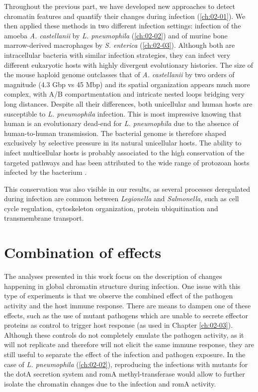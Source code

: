 Throughout the previous part, we have developed new approaches to detect chromatin features and quantify their changes during infection (\autoref{ch:02-01}). We then applied these methods in two different infection settings: infection of the amoeba \textit{A. castellanii} by \textit{L. pneumophila} (\autoref{ch:02-02}) and of murine bone marrow-derived macrophages by \textit{S. enterica} (\autoref{ch:02-03}). Although both are intracellular bacteria with similar infection strategies, they can infect very different eukaryotic hosts with highly divergent evolutionary histories. The size of the mouse haploid genome outclasses that of \textit{A. castellanii} by two orders of magnitude (4.3 Gbp vs 45 Mbp) and its spatial organization appears much more complex, with A/B compartmentation and intricate nested loops bridging very long distances. Despite all their differences, both unicellular and human hosts are susceptible to \textit{L. pneumophila} infection. This is most impressive knowing that human is an evolutionary dead-end for \textit{L. pneumophila} due to the absence of human-to-human transmission. The bacterial genome is therefore shaped exclusively by selective pressure in its natural unicellular hosts. The ability to infect multicellular hosts is probably associated to the high conservation of the targeted pathways and has been attributed to the wide range of protozoan hosts infected by the bacterium \cite{molofskyDifferentiateThriveLessons2004}.

This conservation was also visible in our results, as several processes deregulated during infection are common between \textit{Legionella} and \textit{Salmonella}, such as cell cycle regulation, cytoskeleton organization, protein ubiquitination and transmembrane transport.


\section{Combination of effects}

The analyses presented in this work focus on the description of changes happening in global chromatin structure during infection. One issue with this type of experiments is that we observe the combined effect of the pathogen activity and the host immune response. There are means to dampen one of these effects, such as the use of mutant pathogens which are unable to secrete effector proteins as control to trigger host response (as used in Chapter \autoref{ch:02-03}). Although these controls do not completely emulate the pathogen activity, as it will not replicate  \cite{vogelConjugativeTransferVirulence1998} and therefore will not elicit the same immune response, they are still useful to separate the effect of the infection and pathogen exposure. In the case of \textit{L. pneumophila} (\autoref{ch:02-02}), reproducing the infections with mutants for the dotA secretion system and romA methyl-transferase would allow to further isolate the chromatin changes due to the infection and romA activity.

